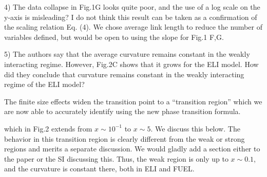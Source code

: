 \documentclass[11pt]{article}
\begin{document}
\begin{response}{
4) The data collapse in Fig.1G looks quite poor, and the use of a log scale on the y-axis is misleading? I do not think this result can be taken as a confirmation of the scaling relation Eq. (4). 
}
We chose average link length to reduce the number of variables defined, but would be open to using the slope for Fig.1 F,G. 
\end{response}
\begin{response}{
5) The authors say that the average curvature remains constant in the weakly interacting regime. However, Fig.2C shows that it grows for the ELI model. How did they conclude that curvature remains constant in the weakly interacting regime of the ELI model?
}

The finite size effects widen the transition point to a ``transition region'' which we are now able to accurately identify using the new phase transition formula.


which in Fig.2 extends from $x\sim 10^{-1}$ to $x\sim 5$. 
We discuss this below.
The behavior in this transition region is clearly different from the weak or strong regions and merits a separate discussion. 
We would gladly add a section either to the paper or the SI discussing this.
Thus, the weak region is only up to $x\sim 0.1$, and the curvature is constant there, both in ELI and FUEL.


 
\end{response}
\end{document}
